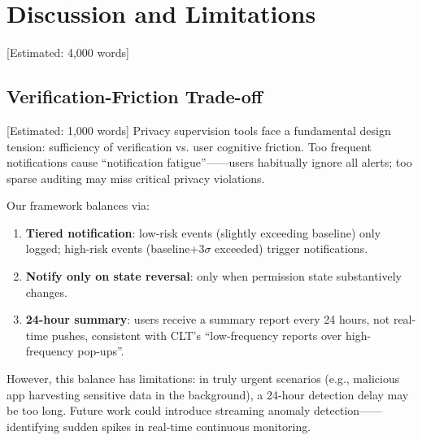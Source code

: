 \newpage\section{Discussion and Limitations} [Estimated: 4,000 words]

\subsection{Verification-Friction Trade-off} [Estimated: 1,000 words]
Privacy supervision tools face a fundamental design tension: sufficiency of verification vs. user cognitive friction. Too frequent notifications cause ``notification fatigue''——users habitually ignore all alerts; too sparse auditing may miss critical privacy violations.

Our framework balances via:
\begin{enumerate}
\item \textbf{Tiered notification}: low-risk events (slightly exceeding baseline) only logged; high-risk events (baseline+3$\sigma$ exceeded) trigger notifications.
\item \textbf{Notify only on state reversal}: only when permission state substantively changes.
\item \textbf{24-hour summary}: users receive a summary report every 24 hours, not real-time pushes, consistent with CLT's ``low-frequency reports over high-frequency pop-ups''.
\end{enumerate}

However, this balance has limitations: in truly urgent scenarios (e.g., malicious app harvesting sensitive data in the background), a 24-hour detection delay may be too long. Future work could introduce streaming anomaly detection——identifying sudden spikes in real-time continuous monitoring.

